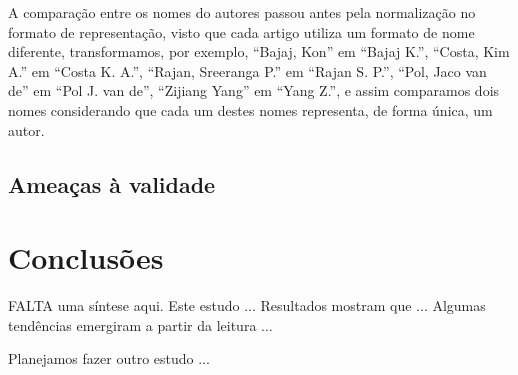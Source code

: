 


A comparação entre os nomes do autores passou antes pela normalização
no formato de representação, visto que cada artigo utiliza um formato
de nome diferente, transformamos, por exemplo, ``Bajaj, Kon'' em ``Bajaj K.'',
``Costa, Kim A.'' em ``Costa K. A.'', ``Rajan, Sreeranga P.'' em ``Rajan S. P.'',
``Pol, Jaco van de'' em ``Pol J. van de'', ``Zijiang Yang'' em ``Yang Z.'',
e assim comparamos dois nomes considerando que cada um destes nomes representa,
de forma única, um autor.

\subsection{Ameaças à validade}

\section{Conclusões}

FALTA uma síntese aqui. 
Este estudo ...
Resultados mostram que ...
Algumas tendências emergiram a partir da leitura ...

Planejamos fazer outro estudo ... 



%
%
%
%
%
%



